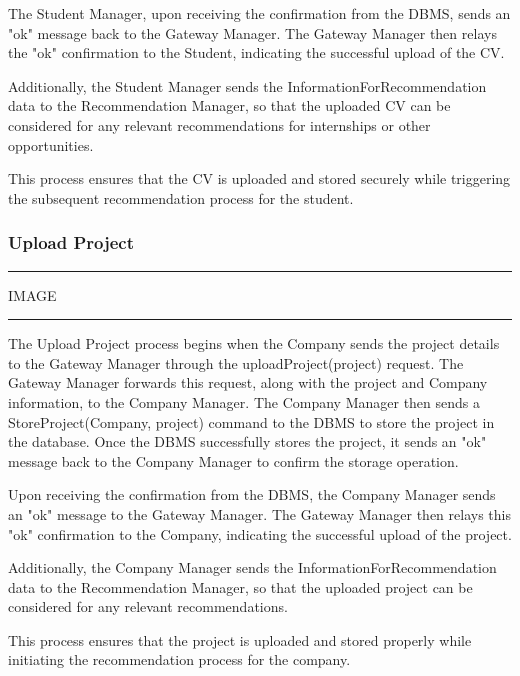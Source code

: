 The Student Manager, upon receiving the confirmation from the DBMS, sends an "ok" message back to the Gateway Manager. The Gateway Manager then relays the "ok" confirmation to the Student, indicating the successful upload of the CV.

Additionally, the Student Manager sends the InformationForRecommendation data to the Recommendation Manager, so that the uploaded CV can be considered for any relevant recommendations for internships or other opportunities.

This process ensures that the CV is uploaded and stored securely while triggering the subsequent recommendation process for the student.

\subsubsection{Upload Project}

\vspace{20pt}
\hrule
\vspace{10pt}
IMAGE
\vspace{10pt}
\hrule
\vspace{20pt}

The Upload Project process begins when the Company sends the project details to the Gateway Manager through the uploadProject(project) request. The Gateway Manager forwards this request, along with the project and Company information, to the Company Manager. The Company Manager then sends a StoreProject(Company, project) command to the DBMS to store the project in the database. Once the DBMS successfully stores the project, it sends an "ok" message back to the Company Manager to confirm the storage operation.

Upon receiving the confirmation from the DBMS, the Company Manager sends an "ok" message to the Gateway Manager. The Gateway Manager then relays this "ok" confirmation to the Company, indicating the successful upload of the project.

Additionally, the Company Manager sends the InformationForRecommendation data to the Recommendation Manager, so that the uploaded project can be considered for any relevant recommendations.

This process ensures that the project is uploaded and stored properly while initiating the recommendation process for the company.

